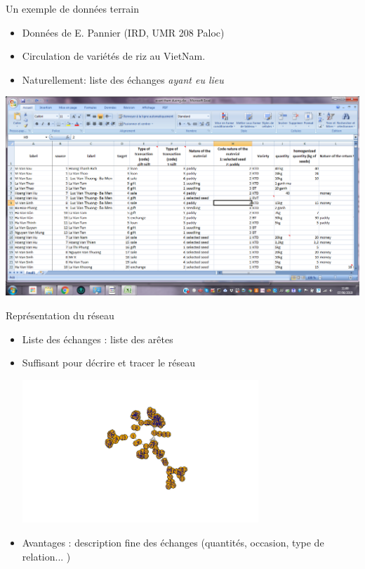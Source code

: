 \documentclass[compress,10pt]{beamer}
\begin{document}
\begin{frame}{Un exemple de données terrain}


\begin{itemize}
\item Données de E. Pannier (IRD, UMR 208 Paloc)
\item Circulation de variétés de riz au VietNam. 
\item Naturellement:  liste des échanges \emph{ayant eu lieu}
\end{itemize}
 \includegraphics[width =  \textwidth]{plots/data_pannier_reseau.png} 
\end{frame}

\begin{frame}{Représentation du réseau}
\begin{itemize}
\item Liste des échanges : liste des arêtes
\item Suffisant pour décrire et tracer le réseau


 \includegraphics[width =  0.7\textwidth]{plots/network_vietnam.png} 

\item Avantages : description fine des échanges (quantités, occasion, type de relation... )

\end{itemize}
\end{frame}
\end{document}
